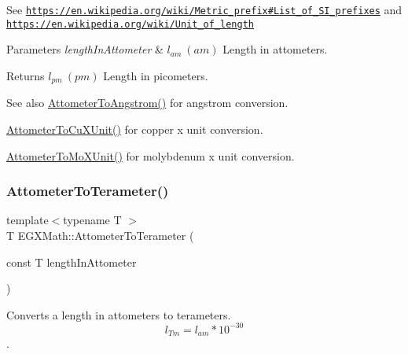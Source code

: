 See \href{https://en.wikipedia.org/wiki/Metric_prefix#List_of_SI_prefixes}{\tt https\+://en.\+wikipedia.\+org/wiki/\+Metric\+\_\+prefix\#\+List\+\_\+of\+\_\+\+S\+I\+\_\+prefixes} and \href{https://en.wikipedia.org/wiki/Unit_of_length}{\tt https\+://en.\+wikipedia.\+org/wiki/\+Unit\+\_\+of\+\_\+length} 
\begin{DoxyParams}{Parameters}
{\em length\+In\+Attometer} & $ l_{am}\ (am)$ Length in attometers. \\
\hline
\end{DoxyParams}
\begin{DoxyReturn}{Returns}
$ l_{pm}\ (pm)$ Length in picometers. 
\end{DoxyReturn}
\begin{DoxySeeAlso}{See also}
\mbox{\hyperlink{group___e_g_x_math-_conversions-_length_conversions-_attometer-_non-_s_i_ga331ff6e8159f6f00bb7a20e39fa4d756}{Attometer\+To\+Angstrom()}} for angstrom conversion. 

\mbox{\hyperlink{group___e_g_x_math-_conversions-_length_conversions-_attometer-_non-_s_i_gabd388c2e0821ac9066b4fb87e35402b1}{Attometer\+To\+Cu\+X\+Unit()}} for copper x unit conversion. 

\mbox{\hyperlink{group___e_g_x_math-_conversions-_length_conversions-_attometer-_non-_s_i_ga79ec6f4ec4a97af05fe8f69b80805ab7}{Attometer\+To\+Mo\+X\+Unit()}} for molybdenum x unit conversion. 
\end{DoxySeeAlso}
\mbox{\label{group___e_g_x_math-_conversions-_length_conversions-_attometer-_s_i_gac4d61e3aceb437ff7d52729ed4860f61}} 
\subsubsection{\texorpdfstring{Attometer\+To\+Terameter()}{AttometerToTerameter()}}
{\footnotesize\ttfamily template$<$typename T $>$ \\
T E\+G\+X\+Math\+::\+Attometer\+To\+Terameter (\begin{DoxyParamCaption}\item[{const T}]{length\+In\+Attometer }\end{DoxyParamCaption})}



Converts a length in attometers to terameters. \[ l_{Tm}=l_{am} * 10^{-30} \]. 

